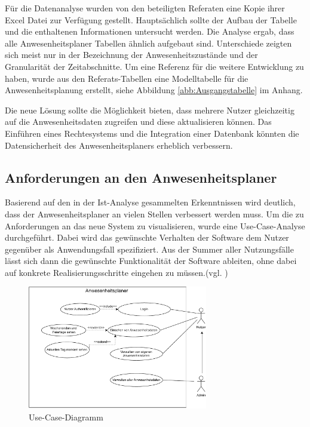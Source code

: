 Für die Datenanalyse wurden von den beteiligten Referaten eine Kopie ihrer Excel Datei zur Verfügung gestellt. Hauptsächlich sollte der Aufbau der Tabelle und die enthaltenen Informationen untersucht werden. Die Analyse ergab, dass alle Anwesenheitsplaner Tabellen ähnlich aufgebaut sind. Unterschiede zeigten sich meist nur in der Bezeichnung der Anwesenheitszustände und der Granularität der Zeitabschnitte. Um eine Referenz für die weitere Entwicklung zu haben, wurde aus den Referats-Tabellen eine Modelltabelle für die Anwesenheitsplanung erstellt, siehe Abbildung \ref{abb:Ausgangstabelle} im Anhang.

Die neue Lösung sollte die Möglichkeit bieten, dass mehrere Nutzer gleichzeitig auf die Anwesenheitsdaten zugreifen und diese aktualisieren können. Das Einführen eines Rechtesystems und die Integration einer Datenbank könnten die Datensicherheit des Anwesenheitsplaners erheblich verbessern.

\newpage

\subsection{Anforderungen an den Anwesenheitsplaner}
\label{sec:Soll-Zustand}
Basierend auf den in der Ist-Analyse gesammelten Erkenntnissen wird deutlich, dass der Anwesenheitsplaner an vielen Stellen verbessert werden muss. Um die zu Anforderungen an das neue System zu visualisieren, wurde eine Use-Case-Analyse durchgeführt. Dabei wird das gewünschte Verhalten der Software dem Nutzer gegenüber als Anwendungsfall spezifiziert. Aus der Summer aller Nutzungsfälle lässt sich dann die gewünschte Funktionalität der Software ableiten, ohne dabei auf konkrete Realisierungsschritte eingehen zu müssen.(vgl. \cite[S. 164]{neumann-2002})

\begin{figure}[htb]
    \centering
    \includegraphics[width=0.7\textwidth,angle=0]{abb/use-case-diagramm.pdf}
    \caption[Use-Case-Diagramm]{Use-Case-Diagramm}
    \label{fig:Use-Case-Diagramm}
\end{figure}

